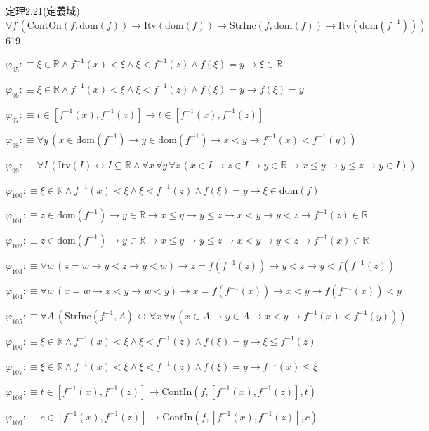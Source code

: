 \begin{fullproof}{定理2.21(定義域)}{$\forall f\,(\mathrm{ContOn}(f,\mathrm{dom}(f)) \to \mathrm{Itv}(\mathrm{dom}(f)) \to \mathrm{StrInc}(f,\mathrm{dom}(f)) \to \mathrm{Itv}(\mathrm{dom}(f^{-1})))$}{619}
\begin{abbrevlist}
\item $\varphi_{95} :\equiv \xi \in \mathbb{R} \land f^{-1}(x) < \xi \land \xi < f^{-1}(z) \land f(\xi) = y \to \xi \in \mathbb{R}$
\item $\varphi_{96} :\equiv \xi \in \mathbb{R} \land f^{-1}(x) < \xi \land \xi < f^{-1}(z) \land f(\xi) = y \to f(\xi) = y$
\item $\varphi_{97} :\equiv t \in [f^{-1}(x),f^{-1}(z)] \to t \in [f^{-1}(x),f^{-1}(z)]$
\item $\varphi_{98} :\equiv \forall y\,(x \in \mathrm{dom}(f^{-1}) \to y \in \mathrm{dom}(f^{-1}) \to x < y \to f^{-1}(x) < f^{-1}(y))$
\item $\varphi_{99} :\equiv \forall I\,(\mathrm{Itv}(I) \leftrightarrow I \subseteq \mathbb{R} \land \forall x\,\forall y\,\forall z\,(x \in I \to z \in I \to y \in \mathbb{R} \to x \leq y \to y \leq z \to y \in I))$
\item $\varphi_{100} :\equiv \xi \in \mathbb{R} \land f^{-1}(x) < \xi \land \xi < f^{-1}(z) \land f(\xi) = y \to \xi \in \mathrm{dom}(f)$
\item $\varphi_{101} :\equiv z \in \mathrm{dom}(f^{-1}) \to y \in \mathbb{R} \to x \leq y \to y \leq z \to x < y \to y < z \to f^{-1}(z) \in \mathbb{R}$
\item $\varphi_{102} :\equiv z \in \mathrm{dom}(f^{-1}) \to y \in \mathbb{R} \to x \leq y \to y \leq z \to x < y \to y < z \to f^{-1}(x) \in \mathbb{R}$
\item $\varphi_{103} :\equiv \forall w\,(z = w \to y < z \to y < w) \to z = f(f^{-1}(z)) \to y < z \to y < f(f^{-1}(z))$
\item $\varphi_{104} :\equiv \forall w\,(x = w \to x < y \to w < y) \to x = f(f^{-1}(x)) \to x < y \to f(f^{-1}(x)) < y$
\item $\varphi_{105} :\equiv \forall A\,(\mathrm{StrInc}(f^{-1},A) \leftrightarrow \forall x\,\forall y\,(x \in A \to y \in A \to x < y \to f^{-1}(x) < f^{-1}(y)))$
\item $\varphi_{106} :\equiv \xi \in \mathbb{R} \land f^{-1}(x) < \xi \land \xi < f^{-1}(z) \land f(\xi) = y \to \xi \leq f^{-1}(z)$
\item $\varphi_{107} :\equiv \xi \in \mathbb{R} \land f^{-1}(x) < \xi \land \xi < f^{-1}(z) \land f(\xi) = y \to f^{-1}(x) \leq \xi$
\item $\varphi_{108} :\equiv t \in [f^{-1}(x),f^{-1}(z)] \to \mathrm{ContIn}(f,[f^{-1}(x),f^{-1}(z)],t)$
\item $\varphi_{109} :\equiv c \in [f^{-1}(x),f^{-1}(z)] \to \mathrm{ContIn}(f,[f^{-1}(x),f^{-1}(z)],c)$

\end{abbrevlist}
\end{fullproof}
